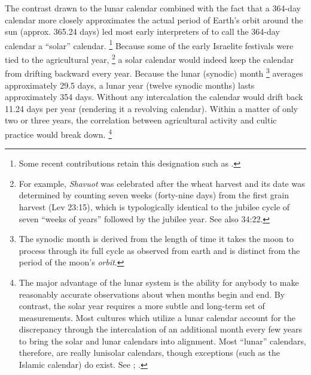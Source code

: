 
\noindent
The contrast drawn to the lunar calendar combined with the fact that a 364-day calendar more closely approximates the actual period of Earth's orbit around the sun (approx. 365.24 days) led most early interpreters of \jub to call the 364-day calendar a ``solar'' calendar.%
    \footnote{%
        Some recent contributions retain this designation such as 
        \cite[10]{stern2001}.}
Because some of the early Israelite festivals were tied to the agricultural year,%
    \footnote{%
        For example, \emph{Shavuot} was celebrated after the wheat harvest and its date was determined by counting seven weeks (forty-nine days) from the first grain harvest (Lev 23:15), which is typologically identical to the jubilee cycle of seven ``weeks of years'' followed by the jubilee year. See also 34:22.}    
a solar calendar would indeed keep the calendar from drifting backward every year. Because the lunar (synodic) month%
    \footnote{%
        The synodic month is derived from the length of time it takes the moon to process through its full cycle as observed from earth and is distinct from the period of the moon's \emph{orbit}.}
averages approximately 29.5 days, a lunar year (twelve synodic months) lasts approximately 354 days. Without any intercalation the calendar would drift back 11.24 days per year (rendering it a revolving calendar). Within a matter of only two or three years, the correlation between agricultural activity and cultic practice would break down.%
    \footnote{%
        The major advantage of the lunar system is the ability for anybody to make reasonably accurate observations about when months begin and end. By contrast, the solar year requires a more subtle and long-term set of measurements. Most cultures which utilize a lunar calendar account for the discrepancy through the intercalation of an additional month every few years to bring the solar and lunar calendars into alignment. Most ``lunar'' calendars, therefore, are really lunisolar calendars, though exceptions (such as the Islamic calendar) do exist. See
        \cite[214, 238]{glessmer_flint-vanderkam1999}; 
        \cite[37--38]{horowitz_janes1996}.}

